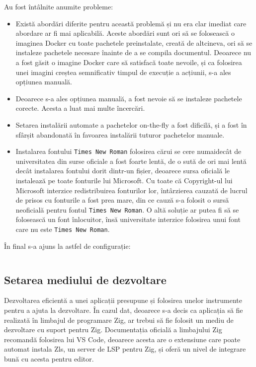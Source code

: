 \documentclass[a4paper,12pt]{report}
\begin{document}
Au fost întâlnite anumite probleme:
\begin{itemize}
    \item 
    Există abordări diferite pentru această problemă și nu era clar imediat care abordare ar fi
    mai aplicabilă.
    Aceste abordări sunt ori să se folosească o imaginea Docker cu toate pachetele preinstalate,
    creată de altcineva, ori să se instaleze pachetele necesare înainte de a se compila documentul.
    Deoarece nu a fost găsit o imagine Docker care să satisfacă toate nevoile,
    și ca folosirea unei imagini creștea semnificativ timpul de execuție a acțiunii,
    s-a ales opțiunea manuală.

    \item
    Deoarece s-a ales opțiunea manuală, a fost nevoie să se instaleze pachetele corecte.
    Acesta a luat mai multe încercări.

    \item
    Setarea instalării automate a pachetelor on-the-fly a fost dificilă,
    și a fost în sfârșit abandonată în favoarea instalării tuturor pachetelor manuale.

    \item
    Instalarea fontului \texttt{Times New Roman} folosirea cărui se cere numaidecât de universitatea
    din surse oficiale a fost foarte lentă, de o sută de ori mai lentă decât instalarea fontului dorit
    dintr-un fișier, deoarece sursa oficială le instalează pe toate fonturile lui Microsoft.
    Cu toate că Copyright-ul lui Microsoft interzice redistribuirea fonturilor lor,
    întârzierea cauzată de lucrul de prisos cu fonturile a fost prea mare,
    din ce cauză s-a folosit o sursă neoficială pentru fontul \texttt{Times New Roman}.
    O altă soluție ar putea fi să se folosească un font înlocuitor, însă
    universitate interzice folosirea unui font care nu este \texttt{Times New Roman}.
\end{itemize}

În final s-a ajuns la astfel de configurație:

\inputminted{cs}{../.github/workflows/latex.yml}


\subsection{Setarea mediului de dezvoltare}

Dezvoltarea eficientă a unei aplicații presupune și folosirea
unelor instrumente pentru a ajuta la dezvoltare.
În cazul dat, deoarece s-a decis ca aplicația să fie realizată în limbajul de programare Zig,
ar trebui să fie folosit un mediu de dezvoltare cu suport pentru Zig.
Documentația oficială a limbajului Zig\cite{zig} recomandă folosirea lui VS Code, deoarece acesta
are o extensiune care poate automat instala Zls\cite{zls}, un server de \ac{LSP} pentru Zig,
și oferă un nivel de integrare bună cu acesta pentru editor.
\end{document}
